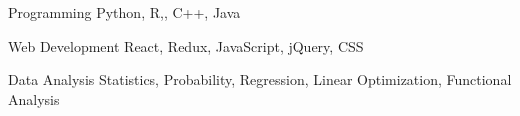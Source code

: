 

\begin{cvskills}

  \cvskill
    {Programming} %
    {Python, R,, C++, Java} %

  \cvskill
    {Web Development} %
    {React, Redux, JavaScript, jQuery, CSS} %

  \cvskill
    {Data Analysis} %
    {Statistics, Probability, Regression, Linear Optimization, Functional Analysis} %

\end{cvskills}